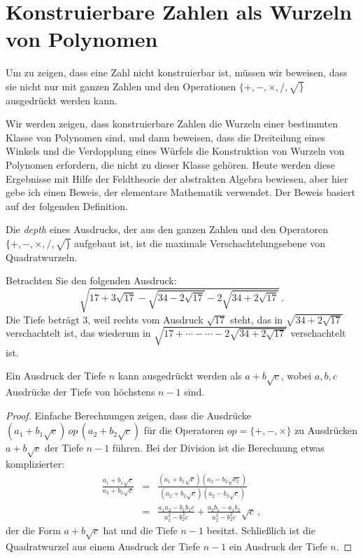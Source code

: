 \section{Konstruierbare Zahlen als Wurzeln von Polynomen}\label{s.trisect-poly}
Um zu zeigen, dass eine Zahl nicht konstruierbar ist, müssen wir beweisen, dass sie nicht nur mit ganzen Zahlen und den Operationen $\{+,-,\times,/,\surd\}$ ausgedrückt werden kann.

Wir werden zeigen, dass konstruierbare Zahlen die Wurzeln einer bestimmten Klasse von Polynomen sind, und dann beweisen, dass die Dreiteilung eines Winkels und die Verdopplung eines Würfels die Konstruktion von Wurzeln von Polynomen erfordern, die nicht zu dieser Klasse gehören. Heute werden diese Ergebnisse mit Hilfe der Feldtheorie der abstrakten Algebra bewiesen, aber hier gebe ich einen Beweis, der elementare Mathematik verwendet. Der Beweis basiert auf der folgenden Definition.

\begin{definition}
Die \emph{depth} eines Ausdrucks, der aus den ganzen Zahlen und den Operatoren $\{+,-,\times,/,\surd\}$ aufgebaut ist, ist die maximale Verschachtelungsebene von Quadratwurzeln.
\end{definition}

\begin{example}
Betrachten Sie den folgenden Ausdruck:
\[
\sqrt{17+3\sqrt{17} - \sqrt{34-2\sqrt{17}}
  -2\sqrt{34+2\sqrt{17}} }\,.
\]
Die Tiefe beträgt $3$, weil rechts vom Ausdruck $\sqrt{17}$ steht, das in $\sqrt{34+2\sqrt{17}}$ verschachtelt ist, das wiederum in
$\sqrt{17+\cdots-\cdots-2\sqrt{34+2\sqrt{17}}}$
verschachtelt ist.
\end{example}

\begin{theorem}
Ein Ausdruck der Tiefe $n$ kann ausgedrückt werden als $a+b\sqrt{c}$, wobei $a,b,c$ Ausdrücke der Tiefe von höchstens $n-1$ sind.
\end{theorem}
\begin{proof}
Einfache Berechnungen zeigen, dass die Ausdrücke $(a_1+b_1\sqrt{c})\,\mathit{op}\,(a_2+b_2\sqrt{c})$ für die Operatoren $\mathit{op}=\{+,-,\times\}$ zu Ausdrücken $a+b\sqrt{c}$ der Tiefe $n-1$ führen. Bei der Division ist die Berechnung etwas komplizierter:
\begin{eqnarray*}
\frac{a_1+b_1\sqrt{c}}{a_2+b_2\sqrt{c}}&=&
\frac{(a_1+b_1\sqrt{c})(a_2-b_2\sqrt{c_2})}{(a_2+b_2\sqrt{c})(a_2-b_2\sqrt{c})}\\
&=&\frac{a_1a_2-b_1b_2c}{a_2^2-b_2^2c}+\frac{a_2b_1-a_1b_2}{a_2^2-b_2^2c}\sqrt{c}\,,
\end{eqnarray*}
der die Form $a+b\sqrt{c}$ hat und die Tiefe $n-1$ besitzt.
Schließlich ist die Quadratwurzel aus einem Ausdruck der Tiefe $n-1$ ein Ausdruck der Tiefe $n$.
\end{proof}


